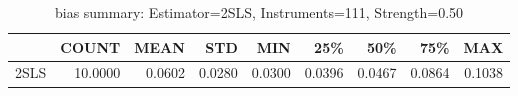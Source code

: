 \begin{table}[ht]
\centering
\caption{bias summary: Estimator=2SLS, Instruments=111, Strength=0.50}
\begin{tabular}{lrrrrrrrr}
\toprule
 & COUNT & MEAN & STD & MIN & 25\% & 50\% & 75\% & MAX \\
\midrule
2SLS & 10.0000 & 0.0602 & 0.0280 & 0.0300 & 0.0396 & 0.0467 & 0.0864 & 0.1038 \\
\bottomrule
\end{tabular}
\end{table}
